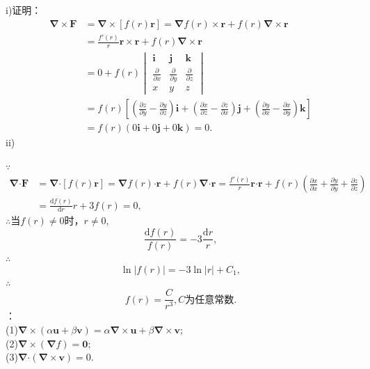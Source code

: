 \documentclass[12pt,UTF8,fleqn]{ctexart}
\newcommand{\md}[1]{\mathrm d#1}
\newcommand{\pp}[2]{\frac{\partial #1}{\partial #2}}
\begin{document}
\begin{enumerate}
i)证明：
\[\begin{split}
\bm\nabla\times\bm F&=\bm\nabla\times[f(r)\bm r]=\bm\nabla f(r)\times\bm r+f(r)\bm\nabla\times\bm r\\
&=\frac{f'(r)}r\bm r\times\bm r+f(r)\bm\nabla\times\bm r\\
&=0+f(r)\begin{vmatrix}
\bm i&\bm j&\bm k\\
\pp{}x&\pp{}y&\pp{}z\\
x&y&z
\end{vmatrix}\\
&=f(r)[(\pp zy-\pp yz)\bm i+(\pp xz-\pp zx)\bm j+(\pp yx-\pp xy)\bm k]\\
&=f(r)(0\bm i+0\bm j+0\bm k)=0.
\end{split}\]
ii)

$\because$
\[\begin{split}
\bm\nabla\bm\cdot\bm F&=\bm\nabla\bm\cdot[f(r)\bm r]=\bm\nabla f(r)\bm\cdot\bm r+f(r)\bm\nabla\bm\cdot\bm r=\frac{f'(r)}r\bm r\bm\cdot\bm r+f(r)(\pp xx+\pp yy+\pp zz)\\
&=\frac{\md f(r)}{\md r}r+3f(r)=0,
\end{split}\]
$\therefore$当$f(r)\neq0$时，$r\neq0$,
\[\frac{\md f(r)}{f(r)}=-3\frac{\md r}r,\]
$\therefore$
\[
\ln|f(r)|=-3\ln|r|+C_1,
\]
$\therefore$
\[
f(r)=\frac C{r^3},\text{$C$为任意常数}.
\]
：\\
(1)$\bm\nabla\times(\alpha\bm u+\beta\bm v)=\alpha\bm\nabla\times\bm u+\beta\bm\nabla\times\bm v$;\\
(2)$\bm\nabla\times(\bm\nabla f)=\bm0$;\\
(3)$\bm\nabla\bm\cdot(\bm\nabla\times\bm v)=0$.


\end{enumerate}
\end{document}
